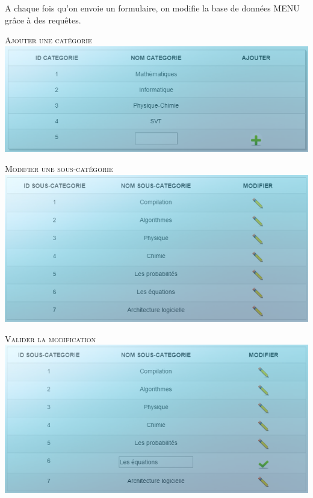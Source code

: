 \documentclass[hidelinks, 12pt,a4paper]{article}
\begin{document}
A chaque fois qu'on envoie un formulaire, on modifie la base de données MENU grâce à des requêtes.\\

\newpage
\begin{center}
\textsc{Ajouter une catégorie}\\
\includegraphics[width=16cm]{images/ajoutcat.png}\\
\end{center}

\begin{center}
\textsc{Modifier une sous-catégorie}\\
\includegraphics[width=16cm]{images/modifcateg.png}\\
\end{center}

\newpage
\begin{center}
\textsc{Valider la modification}\\
\includegraphics[width=16cm]{images/modifcateg2.png}\\
\end{center}
\end{document}
